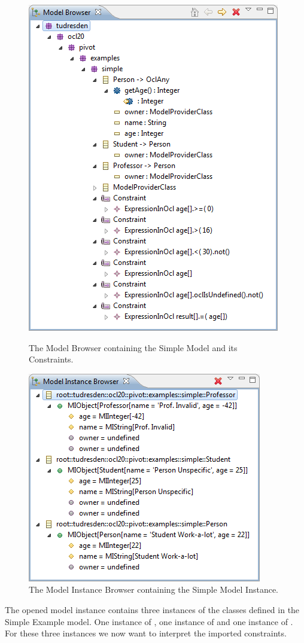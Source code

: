 \begin{figure}[!p]
	\centering
	\includegraphics[width=0.6\linewidth]{figures/interpreter/prepare01}
	\caption{The Model Browser containing the Simple Model and its Constraints.}
	\label{pic:interpret:prepare01}

  \vspace{4.0em}
  
	\centering
	\includegraphics[width=0.6\linewidth]{figures/interpreter/prepare02}
	\caption{The Model Instance Browser containing the Simple Model Instance.}
	\label{pic:interpret:prepare02}
\end{figure}

The opened model instance contains three instances of the classes defined in the Simple Example model. One instance of , one instance of  and one instance of . For these three instances we now want to interpret the imported constraints.



